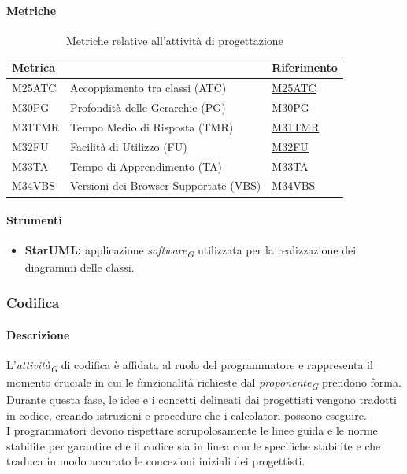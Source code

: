 \paragraph{Metriche} 
\begin{table}[H]
    \centering
    \begin{tabular}{|C{3cm}|C{4cm}|C{3cm}|}
    \hline
    \textbf{Metrica} &  & \textbf{Riferimento} \\
    \hline \hline
    M25ATC & Accoppiamento tra classi (ATC) & \hyperlink{item:M25ATC}{M25ATC}\\
    M30PG & Profondità delle Gerarchie (PG) &  \hyperlink{item:M30PG}{M30PG}\\
    M31TMR & Tempo Medio di Risposta (TMR) & \hyperlink{item:M31TMR}{M31TMR}\\
    M32FU & Facilità di Utilizzo (FU) & \hyperlink{item:M32FU}{M32FU}\\
    M33TA & Tempo di Apprendimento (TA) & \hyperlink{item:M33TA}{M33TA}\\
    M34VBS & Versioni dei Browser Supportate (VBS) & \hyperlink{item:M34VBS}{M34VBS}\\
    \hline
    \end{tabular}
    \caption{Metriche relative all'attività di progettazione}
\end{table}

\paragraph{Strumenti}
\begin{itemize}
    \item \textbf{StarUML:} applicazione \textit{software}\textsubscript{\textit{G}} utilizzata per la realizzazione dei diagrammi delle classi.
\end{itemize}

\subsubsection{Codifica}
\paragraph{Descrizione}
L'\textit{attività}\textsubscript{\textit{G}} di codifica è affidata al ruolo del programmatore e rappresenta il momento cruciale in cui le funzionalità richieste dal \textit{proponente}\textsubscript{\textit{G}} prendono forma. \\
Durante questa fase, le idee e i concetti delineati dai progettisti vengono tradotti in codice, creando istruzioni e procedure che i calcolatori possono eseguire. \\
I programmatori devono rispettare scrupolosamente le linee guida e le norme stabilite per garantire che il codice sia in linea con le specifiche stabilite e che traduca in modo accurato le concezioni iniziali dei progettisti.
